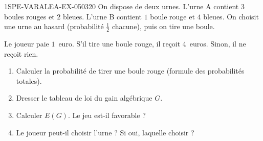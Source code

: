\begin{exercice}{1SPE-VARALEA-EX-050}{3}{20}
On dispose de deux urnes. L'urne A contient $3$ boules rouges et $2$ bleues. L'urne B contient $1$ boule rouge et $4$ bleues. On choisit une urne au hasard (probabilité $\frac{1}{2}$ chacune), puis on tire une boule.

Le joueur paie $1$~euro. S'il tire une boule rouge, il reçoit $4$~euros. Sinon, il ne reçoit rien.

\begin{enumerate}
  \item Calculer la probabilité de tirer une boule rouge (formule des probabilités totales).
  \item Dresser le tableau de loi du gain algébrique $G$.
  \item Calculer $E(G)$. Le jeu est-il favorable ?
  \item Le joueur peut-il choisir l'urne ? Si oui, laquelle choisir ?
\end{enumerate}
\end{exercice}
